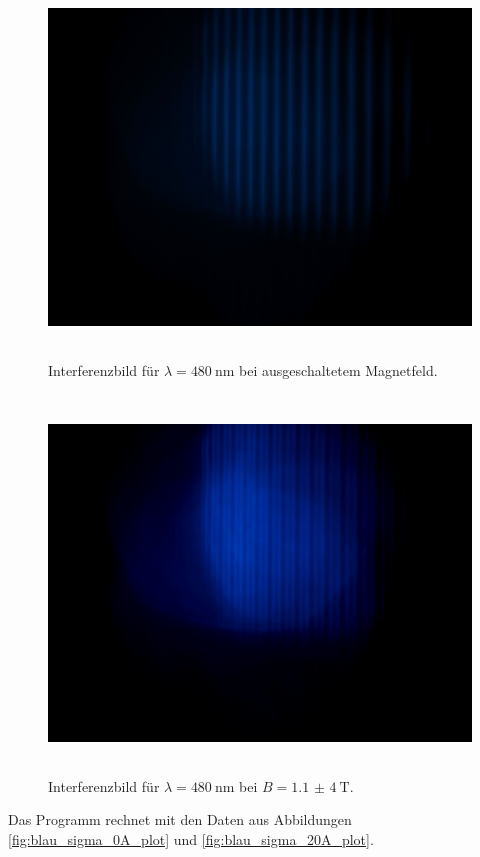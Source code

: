 \begin{figure}[htb]
  \centering
  \includegraphics[height=10cm]{content/pictures/blau_sigma_0A.JPG}
  \caption{Interferenzbild für $\lambda=\SI{480}{\nano\meter}$ bei ausgeschaltetem Magnetfeld.}
  \label{fig:blau_sigma_0A}
\end{figure}
\begin{figure}[htb]
  \centering
  \includegraphics[height=10cm]{content/pictures/blau_sigma_20A.JPG}
  \caption{Interferenzbild für $\lambda=\SI{480}{\nano\meter}$ bei $B=\SI{1,1(4)}{\tesla}$.}
  \label{fig:blau_sigma_20A}
\end{figure}
Das Programm rechnet mit den Daten aus Abbildungen \ref{fig:blau_sigma_0A_plot} und \ref{fig:blau_sigma_20A_plot}.
